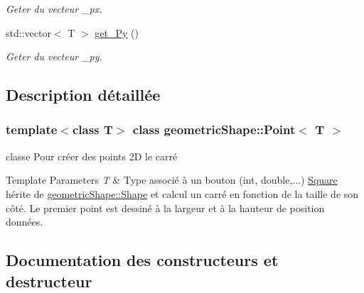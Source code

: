 \begin{DoxyCompactItemize}
\begin{DoxyCompactList}\small\item\em Geter du vecteur \+\_\+px. \end{DoxyCompactList}\item 
\mbox{\label{classgeometric_shape_1_1_point_ae54218db78ed5e7bc9ccf54bd24d4839}} 
std\+::vector$<$ T $>$ \hyperlink{classgeometric_shape_1_1_point_ae54218db78ed5e7bc9ccf54bd24d4839}{get\+\_\+\+Py} ()
\begin{DoxyCompactList}\small\item\em Geter du vecteur \+\_\+py. \end{DoxyCompactList}\end{DoxyCompactItemize}


\subsection{Description détaillée}
\subsubsection*{template$<$class T$>$\newline
class geometric\+Shape\+::\+Point$<$ T $>$}

classe Pour créer des points 2D le carré 


\begin{DoxyTemplParams}{Template Parameters}
{\em T} & Type associé à un bouton (int, double,...) \hyperlink{classgeometric_shape_1_1_square}{Square} hérite de \hyperlink{classgeometric_shape_1_1_shape}{geometric\+Shape\+::\+Shape} et calcul un carré en fonction de la taille de son côté. Le premier point est dessiné à la largeur et à la hauteur de position données.\\
\hline
\end{DoxyTemplParams}


\subsection{Documentation des constructeurs et destructeur}
\mbox{\label{classgeometric_shape_1_1_point_a48370365295e37fbe37ef6b02ca3c2fc}} 
